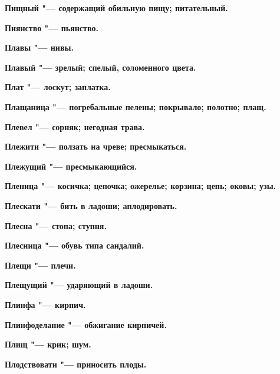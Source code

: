 \begin{multicols}{2}
\bfseries Пищный\normalfont{} "--- содержащий обильную пищу; питательный. 




\bfseries Пиянство\normalfont{} "--- пьянство. 




\bfseries Плавы\normalfont{} "--- нивы. 




\bfseries Плавый\normalfont{} "--- зрелый; спелый, соломенного цвета. 




\bfseries Плат\normalfont{} "--- лоскут; заплатка. 




\bfseries Плащаница\normalfont{} "--- погребальные пелены; покрывало; полотно; плащ. 




\bfseries Плевел\normalfont{} "--- сорняк; негодная трава. 




\bfseries Плежити\normalfont{} "--- ползать на чреве; пресмыкаться. 




\bfseries Плежущий\normalfont{} "--- пресмыкающийся. 




\bfseries Пленица\normalfont{} "--- косичка; цепочка; ожерелье; корзина; цепь; оковы; узы. 




\bfseries Плескати\normalfont{} "--- бить в ладоши; аплодировать. 




\bfseries Плесна\normalfont{} "--- стопа; ступня. 




\bfseries Плесница\normalfont{} "--- обувь типа сандалий. 




\bfseries Плещи\normalfont{} "--- плечи. 




\bfseries Плещущий\normalfont{} "--- ударяющий в ладоши. 




\bfseries Плинфа\normalfont{} "--- кирпич. 




\bfseries Плинфоделание\normalfont{} "--- обжигание кирпичей. 




\bfseries Плищ\normalfont{} "--- крик; шум. 




\bfseries Плодствовати\normalfont{} "--- приносить плоды. 





\end{multicols}
